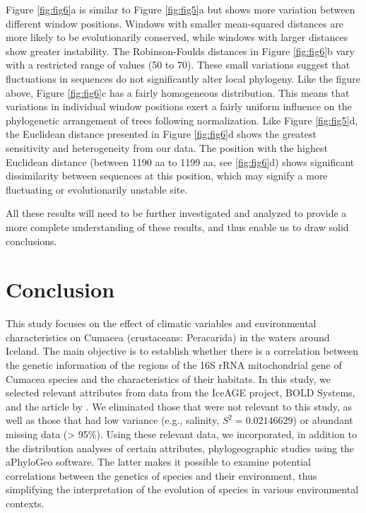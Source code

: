 Figure \ref{fig:fig6}a is similar to Figure \ref{fig:fig5}a but shows more variation between different window positions. Windows with smaller mean-squared distances are more likely to be evolutionarily conserved, while windows with larger distances show greater instability. The Robinson-Foulds distances in Figure \ref{fig:fig6}b vary with a restricted range of values (50 to 70). These small variations suggest that fluctuations in sequences do not significantly alter local phylogeny. Like the figure above, Figure \ref{fig:fig6}c has a fairly homogeneous distribution. This means that variations in individual window positions exert a fairly uniform influence on the phylogenetic arrangement of trees following normalization. Like Figure \ref{fig:fig5}d, the Euclidean distance presented in Figure \ref{fig:fig6}d shows the greatest sensitivity and heterogeneity from our data. The position with the highest Euclidean distance (between 1190 aa to 1199 aa, see \ref{fig:fig6}d) shows significant dissimilarity between sequences at this position, which may signify a more fluctuating or evolutionarily unstable site. 

All these results will need to be further investigated and analyzed to provide a more complete understanding of these results, and thus enable us to draw solid conclusions.

\section{Conclusion}\label{conclusion}

This study focuses on the effect of climatic variables and environmental characteristics on Cumacea (crustaceans: Peracarida) in the waters around Iceland. The main objective is to establish whether there is a correlation between the genetic information of the regions of the 16S rRNA mitochondrial gene of Cumacea species and the characteristics of their habitats. In this study, we selected relevant attributes from data from the IceAGE project, BOLD Systems, and the article by \citep{uhlir_adding_2021}. We eliminated those that were not relevant to this study, as well as those that had low variance (e.g., salinity, $S^2 = 0.02146629$) or abundant missing data (> 95\%). Using these relevant data, we incorporated, in addition to the distribution analyses of certain attributes, phylogeographic studies using the aPhyloGeo software. The latter makes it possible to examine potential correlations between the genetics of species and their environment, thus simplifying the interpretation of the evolution of species in various environmental contexts.

